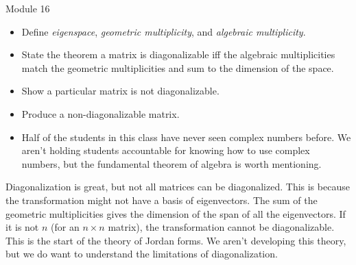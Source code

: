 \documentclass{workbook}
\begin{document}
\begin{lesson}

	Module 16

	\begin{itemize}
		\item Define \emph{eigenspace}, \emph{geometric multiplicity}, and \emph{algebraic multiplicity}.
		\item State the theorem a matrix is diagonalizable iff the algebraic multiplicities match the geometric
			multiplicities and sum to the dimension of the space.
		\item Show a particular matrix is not diagonalizable.
		\item Produce a non-diagonalizable matrix.
	\end{itemize}

	\begin{annotation}
		\begin{notes}
			\begin{itemize}
				\item Half of the students in this class have never seen complex
					numbers before. We aren't holding students accountable
					for knowing how to use complex numbers, but the fundamental
					theorem of algebra is worth mentioning.
			\end{itemize}
		\end{notes}
	\end{annotation}
	Diagonalization is great, but not all matrices can be diagonalized. This is because the transformation might not
	have a basis of eigenvectors. The sum of the geometric multiplicities gives the dimension of the span
	of all the eigenvectors. If it is not $n$ (for an $n\times n$ matrix), the transformation cannot be diagonalizable.
	This is the start of the theory of Jordan forms. We aren't developing this theory, but we do want to understand
	the limitations of diagonalization.

\end{lesson}
\end{document}
